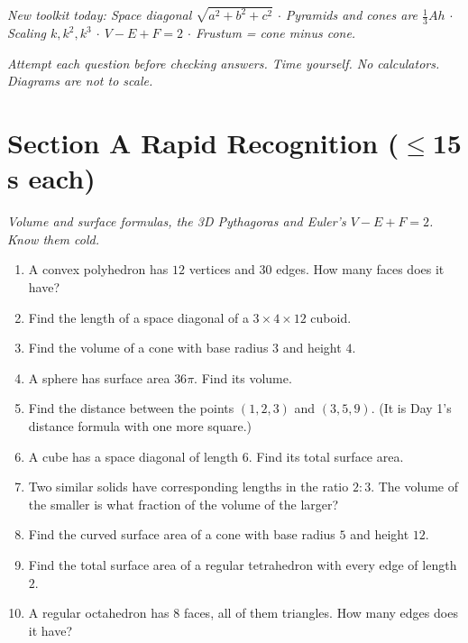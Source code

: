 \documentclass[11pt,a4paper]{article}
\begin{document}
\noindent\textit{New toolkit today: Space diagonal $\sqrt{a^2+b^2+c^2}$ $\cdot$ Pyramids and cones are $\tfrac13Ah$ $\cdot$ Scaling $k,k^2,k^3$ $\cdot$ $V-E+F=2$ $\cdot$ Frustum = cone minus cone.}

\vspace{2pt}
\noindent\textit{Attempt each question before checking answers. Time yourself. No calculators. Diagrams are not to scale.}

\section*{Section A \quad Rapid Recognition \hfill{\normalfont\small($\leq$15 s each)}}

\noindent\textit{Volume and surface formulas, the 3D Pythagoras and Euler's $V-E+F=2$. Know them cold.}

\begin{enumerate}

\item A convex polyhedron has $12$ vertices and $30$ edges. How many faces does it have?

\item Find the length of a space diagonal of a $3\times4\times12$ cuboid.

\item Find the volume of a cone with base radius $3$ and height $4$.

\item A sphere has surface area $36\pi$. Find its volume.

\item Find the distance between the points $(1,2,3)$ and $(3,5,9)$. (It is Day 1's distance formula with one more square.)

\item A cube has a space diagonal of length $6$. Find its total surface area.

\item Two similar solids have corresponding lengths in the ratio $2:3$. The volume of the smaller is what fraction of the volume of the larger?

\item Find the curved surface area of a cone with base radius $5$ and height $12$.

\item Find the total surface area of a regular tetrahedron with every edge of length $2$.

\item A regular octahedron has $8$ faces, all of them triangles. How many edges does it have?

\end{enumerate}
\end{document}
